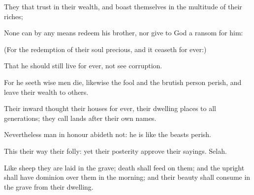 {\Q {}They that
trust in their
wealth, and
boast themselves in the
multitude of their
riches;


\par }{\Q {}None
{}
can by any
means
redeem his
brother, nor
give to
God a
ransom for him:


\par }{\Q {}(For the
redemption of their
soul
{}
precious, and it
ceaseth for
ever:)


\par }{\Q {}That he should still
live for
ever,
{} not
see
corruption.


\par }{\Q {}For he
seeth
{} wise
men
die,
likewise the
fool and the brutish
person
perish, and
leave their
wealth to
others.


\par }{\Q {}Their
inward thought
{} their
houses
{} for
ever,
{} their
dwelling places to
all
generations; they
call
{}
lands after their own
names.


\par }{\Q {}Nevertheless
man
{} in
honour
abideth not: he is
like the
beasts
{}
perish.


\par }{\Q {}This their
way
{} their
folly: yet their
posterity
approve their
sayings.
Selah.


\par }{\Q {}Like
sheep they are
laid in the
grave;
death shall
feed on them; and the
upright shall have
dominion over them in the
morning; and their
beauty shall
consume in the
grave from their
dwelling.


\par }{\BB \par }
